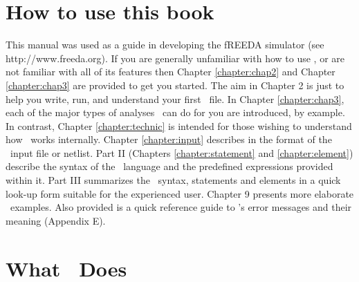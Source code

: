 \section{How to use this book}

This manual was used as a guide in developing the fREEDA simulator (see http://www.freeda.org).
If you are generally unfamiliar with how to use \justspice,
or are not familiar with all of its features then
Chapter \ref{chapter:chap2} and Chapter \ref{chapter:chap3} are provided
to get you started.  The aim in Chapter 2 is just to
help you write, run, and understand your first \justspice\
file.  In Chapter \ref{chapter:chap3}, each of the major types of analyses
\justspice\ can do for you are introduced, by example.
{In contrast, Chapter \ref{chapter:technic} is intended for those
wishing to understand how \spice\ works internally.}
Chapter \ref{chapter:input} describes in the format of the \spice\ input file
or netlist.
{Part II (Chapters \ref{chapter:statement} and
\ref{chapter:element}) describe the syntax of the \spice\
language and the predefined expressions provided within it.}
{Part III summarizes the \spice\ syntax, statements and
elements in a quick look-up form suitable for the experienced user.}
{
Chapter 9 presents more elaborate
\spice\ examples.
Also provided is a quick reference guide to \spice 's error
messages and their meaning (Appendix E).}


\section{What \spice\ Does}

